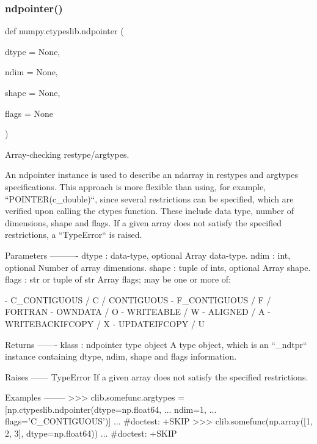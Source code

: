 \subsubsection{\texorpdfstring{ndpointer()}{ndpointer()}}
{\footnotesize\ttfamily def numpy.\+ctypeslib.\+ndpointer (\begin{DoxyParamCaption}\item[{}]{dtype = {\ttfamily None},  }\item[{}]{ndim = {\ttfamily None},  }\item[{}]{shape = {\ttfamily None},  }\item[{}]{flags = {\ttfamily None} }\end{DoxyParamCaption})}

\begin{DoxyVerb}Array-checking restype/argtypes.

An ndpointer instance is used to describe an ndarray in restypes
and argtypes specifications.  This approach is more flexible than
using, for example, ``POINTER(c_double)``, since several restrictions
can be specified, which are verified upon calling the ctypes function.
These include data type, number of dimensions, shape and flags.  If a
given array does not satisfy the specified restrictions,
a ``TypeError`` is raised.

Parameters
----------
dtype : data-type, optional
    Array data-type.
ndim : int, optional
    Number of array dimensions.
shape : tuple of ints, optional
    Array shape.
flags : str or tuple of str
    Array flags; may be one or more of:

      - C_CONTIGUOUS / C / CONTIGUOUS
      - F_CONTIGUOUS / F / FORTRAN
      - OWNDATA / O
      - WRITEABLE / W
      - ALIGNED / A
      - WRITEBACKIFCOPY / X
      - UPDATEIFCOPY / U

Returns
-------
klass : ndpointer type object
    A type object, which is an ``_ndtpr`` instance containing
    dtype, ndim, shape and flags information.

Raises
------
TypeError
    If a given array does not satisfy the specified restrictions.

Examples
--------
>>> clib.somefunc.argtypes = [np.ctypeslib.ndpointer(dtype=np.float64,
...                                                  ndim=1,
...                                                  flags='C_CONTIGUOUS')]
... #doctest: +SKIP
>>> clib.somefunc(np.array([1, 2, 3], dtype=np.float64))
... #doctest: +SKIP\end{DoxyVerb}
 

